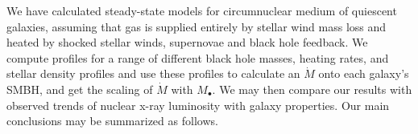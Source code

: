 \documentclass[usenatbib,fleqn]{mn2e}
\newcommand{\Mdot}{\dot{M}}
\newcommand{\rs}{r_s}
\newcommand{\vw}{\tilde{v}_{w}}
\renewcommand{\mp}{m_{\rm p}}
\newcommand{\Mbh}[1][]{M_{\bullet#1}}
\newcommand{\tcool}{t_{\rm cool}}
\newcommand{\tff}{t_{\rm ff}}
\begin{document}







We have calculated steady-state models for circumnuclear medium of
quiescent galaxies, assuming that gas is supplied entirely by stellar
wind mass loss and heated by shocked stellar winds, supernovae and
black hole feedback. We compute profiles for a range of different
black hole masses, heating rates, and stellar density profiles and use
these profiles to calculate an $\Mdot$ onto each galaxy's SMBH, and
get the scaling of $\Mdot$ with $\Mbh$. We may then compare our
results with observed trends of nuclear x-ray luminosity with galaxy
properties. Our main conclusions may be summarized as follows.
\end{document}
